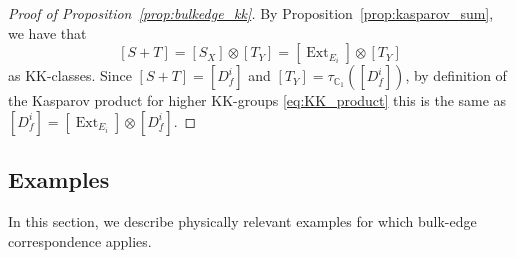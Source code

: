 \documentclass[12pt]{amsart}
\newcommand{\CM}{{\mathbb C}}
\DeclareMathOperator*{\Ext}{Ext}
\begin{document}
\begin{proof}[Proof of Proposition~\ref{prop:bulkedge_kk}]
By Proposition~\ref{prop:kasparov_sum}, we have that
\[[S+T]= [S_X]\otimes [T_Y] = [{\Ext}_{E_i}]\otimes [T_Y]\]
as KK-classes. 
Since $[S+T]=[D_f^{i}]$ and $[T_Y]=\tau_{\CM_1}([D_{\underline{f}}^{i}])$, by definition of the Kasparov product for higher KK-groups \eqref{eq:KK_product} this is the same as $[D_f^i]= [{\Ext}_{E_i}]\otimes [D^i_{\underline{f}}]$.
\end{proof}


\subsection{Examples}\label{ssec:bec_examples}

In this section, we describe physically relevant examples for which bulk-edge correspondence applies. 
\end{document}

